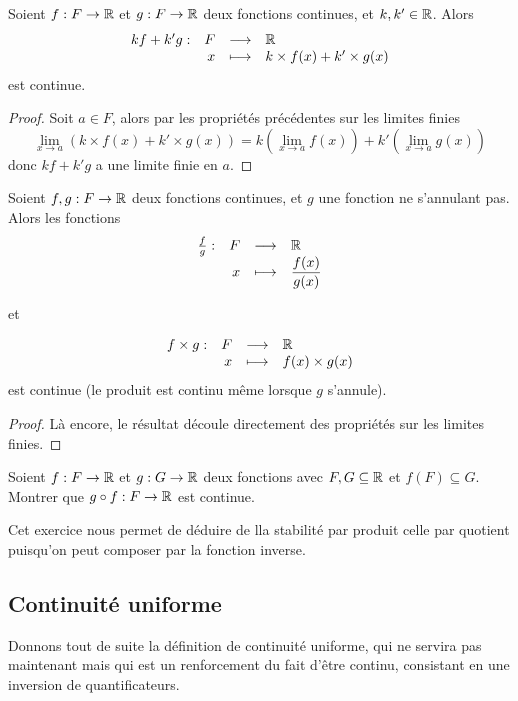 \begin{prop}
    Soient $f : F \to\mathbb{R}$ et $g : F \to\mathbb{R}$ deux fonctions continues, et $k,k'\in\mathbb{R}$. Alors $$\begin{array}[t]{lrcl} kf+k'g: & F & \longrightarrow & \mathbb{R} \\ & x & \longmapsto & k\times f(x) + k' \times g(x) \end{array}$$ est continue.
\end{prop}

\begin{proof}
    Soit $a\in F$, alors par les propriétés précédentes sur les limites finies $$\displaystyle{\lim_{x\to a} (k \times f(x) + k' \times g(x)) = k (\lim_{x\to a} f(x)) + k' (\lim_{x\to a} g(x))}$$ donc $kf + k'g$ a une limite finie en $a$.
\end{proof}

\begin{prop}
    Soient $f,g : F\to \mathbb{R}$ deux fonctions continues, et $g$ une fonction ne s'annulant pas. Alors les fonctions $$\begin{array}[t]{lrcl} \frac{f}{g}: & F & \longrightarrow & \mathbb{R} \\ & x & \longmapsto & \displaystyle{\frac{f(x)}{g(x)}} \end{array}$$\begin{center}et\end{center} $$\begin{array}[t]{lrcl} f\times g: & F & \longrightarrow & \mathbb{R} \\ & x & \longmapsto & f(x)\times g(x) \end{array}$$ est continue (le produit est continu même lorsque $g$ s'annule).
\end{prop}

\begin{proof}
    Là encore, le résultat découle directement des propriétés sur les limites finies.
\end{proof}

\begin{exo}
    Soient $f : F \to\mathbb{R}$ et $g : G\to\mathbb{R}$ deux fonctions avec $F,G\subseteq\mathbb{R}$ et $f(F)\subseteq G$. Montrer que $g\circ f : F\to\mathbb{R}$ est continue.
\end{exo}

\begin{rmk}
    Cet exercice nous permet de déduire de lla stabilité par produit celle par quotient puisqu'on peut composer par la fonction inverse.
\end{rmk}

\subsection{Continuité uniforme}

Donnons tout de suite la définition de continuité uniforme, qui ne servira pas maintenant mais qui est un renforcement du fait d'être continu, consistant en une inversion de quantificateurs.

